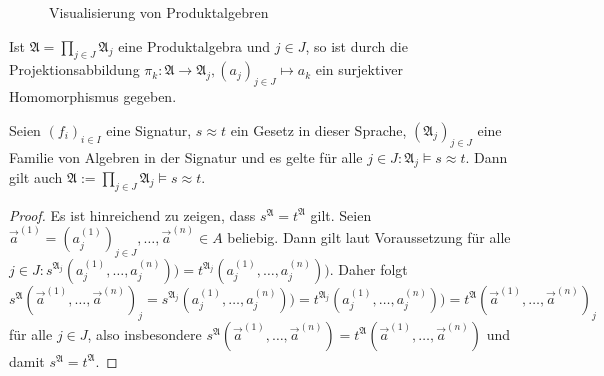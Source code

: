\begin{figure}[H]
    \caption{Visualisierung von Produktalgebren}
    \label{fig:produktalgebra}
\end{figure}

\begin{remark}
    Ist $\mathfrak{A}=\prod_{j\in J}\mathfrak{A}_j$ eine Produktalgebra und $j\in J$, so ist durch die Projektionsabbildung
    $\pi_k:\mathfrak{A}\to \mathfrak{A}_j, (a_j)_{j \in J}\mapsto a_k$ ein surjektiver Homomorphismus gegeben.
\end{remark}

\begin{proposition}
    Seien $(f_i)_{i\in I}$ eine Signatur, $s\approx t$ ein Gesetz in dieser Sprache, $(\mathfrak{A}_j)_{j\in J}$
    eine Familie von Algebren in der Signatur und es gelte für alle $j\in J:\mathfrak{A}_j\models s\approx t$.
    Dann gilt auch $\mathfrak{A}:=\prod_{j\in J}\mathfrak{A}_j\models s\approx t$.
\end{proposition}

\begin{proof}
    Es ist hinreichend zu zeigen, dass $s^\mathfrak{A}=t^\mathfrak{A}$ gilt. Seien $\vec a^{(1)} = (a_j^{(1)})_{j \in J}, \ldots,\vec a^{(n)}\in A$ beliebig.
    Dann gilt laut Voraussetzung für alle $j\in J:s^{\mathfrak{A}_j}(a^{(1)}_j,\ldots,a^{(n)}_j)) = t^{\mathfrak{A}_j}(a^{(1)}_j,\ldots,a^{(n)}_j))$.
    Daher folgt $s^\mathfrak{A}(\vec a^{(1)},\ldots,\vec a^{(n)})_j=s^{\mathfrak{A}_j}(a^{(1)}_j,\ldots,a^{(n)}_j)) = t^{\mathfrak{A}_j}(a^{(1)}_j,\ldots,a^{(n)}_j))=t^\mathfrak{A}(\vec a^{(1)},\ldots,\vec a^{(n)})_j$
    für alle $j\in J$, also insbesondere $s^\mathfrak{A}(\vec a^{(1)},\ldots,\vec a^{(n)})=t^\mathfrak{A}(\vec a^{(1)},\ldots,\vec a^{(n)})$ und damit $s^\mathfrak{A}=t^\mathfrak{A}.$
\end{proof}

